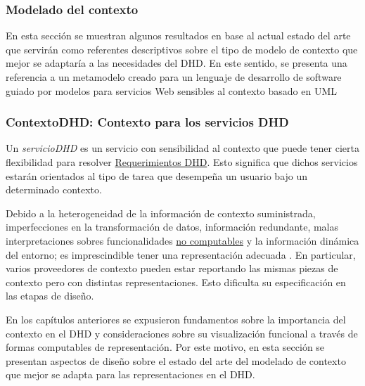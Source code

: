 

\subsubsection {Modelado del contexto} \label{sec:contextodhd}

En esta sección se muestran
algunos resultados en base al actual estado del arte que servirán como referentes
descriptivos sobre el tipo de modelo de contexto que mejor se adaptaría a las
necesidades del DHD. En este  sentido, se presenta una referencia a un metamodelo creado para un
lenguaje de desarrollo de software guiado por modelos para servicios Web
sensibles al contexto basado en UML \cite{ContextUML} 

\subsubsection{ContextoDHD: Contexto para los servicios DHD} \label{contextodhd}

Un \textit{servicioDHD} \label{serviciodhd} es un servicio con sensibilidad al
contexto que puede tener cierta flexibilidad para resolver 
\hyperref[RequerimientosDHD]{Requerimientos DHD}. Esto significa que dichos
servicios estarán orientados al tipo de tarea que desempeña un usuario bajo
un determinado contexto. 


Debido a la heterogeneidad de la información de contexto suministrada,
imperfecciones en la transformación de datos, información redundante, malas
interpretaciones sobres funcionalidades \hyperref[no_computable]{no
computables} y la información dinámica del entorno; es imprescindible tener
una representación adecuada \cite{contextToolKit}. En particular, varios
proveedores de contexto pueden estar reportando las mismas piezas de contexto
pero con distintas representaciones. Esto dificulta su especificación en
las etapas de diseño. 

En los capítulos anteriores se expusieron fundamentos sobre la
importancia del contexto en el DHD y consideraciones sobre su visualización funcional a través de formas computables de representación. Por este motivo, en esta sección se presentan aspectos de
diseño sobre el estado del arte del modelado de contexto que mejor se adapta
para las representaciones en el DHD. 


